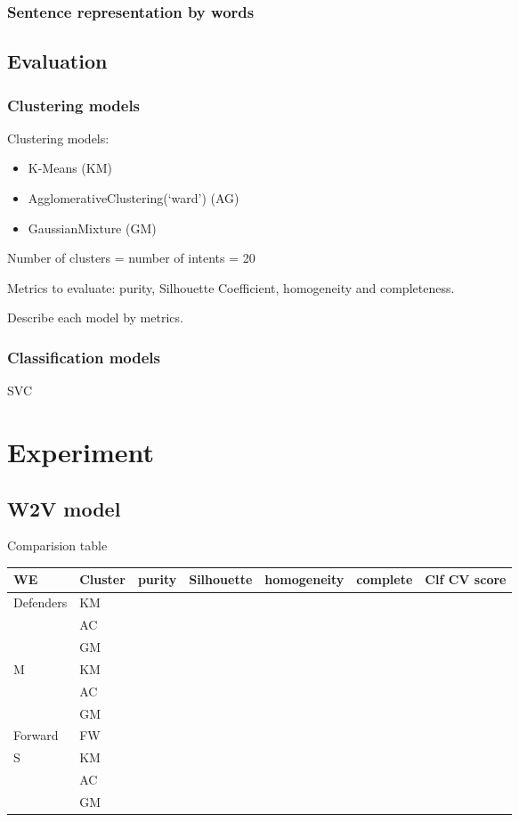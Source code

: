 \documentclass[11pt]{article}
\begin{document}
\subsubsection{Sentence representation by words}

\subsection{Evaluation}

\subsubsection{Clustering models}

Clustering models: 
\begin{itemize}
\item K-Means (KM)
\item AgglomerativeClustering(‘ward’) (AG)
\item GaussianMixture (GM)
\end{itemize}

Number of clusters =  number of intents = 20

Metrics to evaluate: purity, Silhouette Coefficient, homogeneity and completeness.

Describe each model by metrics.



\subsubsection{Classification models}

SVC

\section{Experiment}

\subsection{W2V model}

Comparision table

\begin{tabular}{ |p{2cm}|p{1cm}|c|c|c|c|p{1cm}| }
\hline
WE & Cluster & purity & Silhouette & homogeneity & complete & Clf CV score \\ \hline
\multirow{3}{*}{Defenders} & KM & & & & &\\
 & AC & & & & &\\
 & GM & & & & &\\ \hline
\multirow{3}{*}{M} & KM & & & & &\\
 & AC & & & & &\\
 & GM & & & & &\\ \hline
Forward & FW & & & & &\\ \hline
\multirow{3}{*}{S} & KM & & & & &\\
 & AC & & & & &\\
 & GM & & & & &\\
\hline
\end{tabular}
\end{document}
